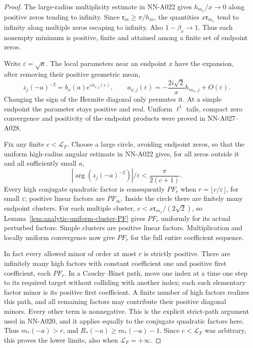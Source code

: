 \begin{proof}
The large-radius multiplicity estimate in NN-A022 gives
$h_{m_x}/x\to0$ along positive zeros tending to infinity.
Since $\mathfrak r_m\ge\pi/h_m$, the quantities
$x\mathfrak r_{m_x}$ tend to infinity along multiple zeros escaping
to infinity. Also $1-\beta_x\to1$. Thus each nonempty minimum is
positive, finite and attained among a finite set of endpoint zeros.

Write $\varepsilon=\sqrt a$. The local parameters near an endpoint
$x$ have the expansion, after removing their positive geometric mean,
\[
 z_j(-a)^{-2}=b_x(a)e^{\varepsilon a_{x,j}(\varepsilon)},\qquad
 a_{x,j}(\varepsilon)=-\frac{2i\sqrt2}{x}h_{m_x,j}
                                             +O(\varepsilon).
\]
Changing the sign of the Hermite diagonal only permutes it. At a
simple endpoint the parameter stays positive and real. Uniform
$\ell^1$ tails, compact zero convergence and positivity of the endpoint
products were proved in NN-A027--A028.

Fix any finite $c<\mathcal L_F$. Choose a large circle, avoiding
endpoint zeros, so that the uniform high-radius angular estimate in
NN-A022 gives, for all zeros outside it and all sufficiently small $a$,
\[
                      |\arg(z_j(-a)^{-2})|/\varepsilon
                                      <\frac{\pi}{2(c+1)}.
\]
Every high conjugate quadratic factor is consequently $PF_r$ when
$r=\lfloor c/\varepsilon\rfloor$, for small $\varepsilon$; positive
linear factors are $PF_\infty$. Inside the circle there are finitely
many endpoint clusters. For each multiple cluster,
$c<x\mathfrak r_{m_x}/(2\sqrt2)$, so
Lemma~\ref{lem:analytic-uniform-cluster-PF} gives $PF_r$ uniformly
for its actual perturbed factors. Simple clusters are positive linear
factors. Multiplication and locally uniform convergence now give
$PF_r$ for the full entire coefficient sequence.

In fact every allowed minor of order at most $r$ is strictly positive.
There are infinitely many high factors with constant coefficient one
and positive first coefficient, each $PF_r$. In a Cauchy--Binet path,
move one index at a time one step to its required target without
colliding with another index; each such elementary factor minor is
its positive first coefficient. A finite number of high factors
realizes this path, and all remaining factors may contribute their
positive diagonal minors. Every other term is nonnegative. This is
the explicit strict-path argument used in NN-A020, and it applies
equally to the conjugate quadratic factors here. Thus
$m_*(-a)>r$, and $R_*(-a)\ge m_*(-a)-1$. Since $c<\mathcal L_F$
was arbitrary, this proves the lower limits, also when
$\mathcal L_F=+\infty$.


\end{proof}
